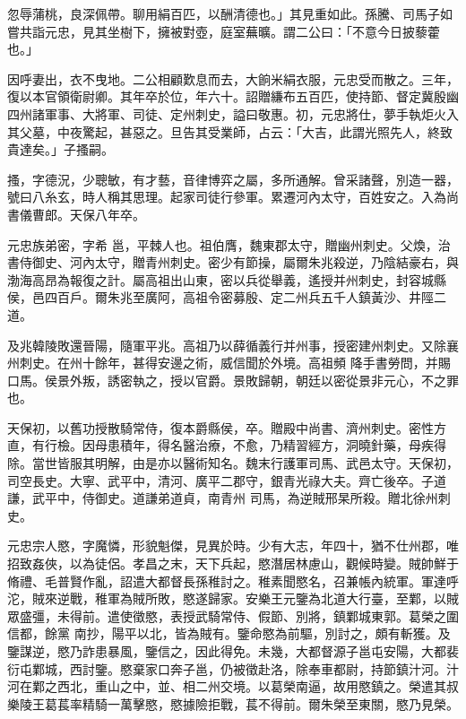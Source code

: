 \begin{pinyinscope}
 忽辱蒲桃，良深佩帶。聊用絹百匹，以酬清德也。」其見重如此。孫騰、司馬子如嘗共詣元忠，見其坐樹下，擁被對壺，庭室蕪曠。謂二公曰：「不意今日披藜藿也。」



 因呼妻出，衣不曳地。二公相顧歎息而去，大餉米絹衣服，元忠受而散之。三年，
 復以本官領衛尉卿。其年卒於位，年六十。詔贈縑布五百匹，使持節、督定冀殷幽四州諸軍事、大將軍、司徒、定州刺史，謚曰敬惠。初，元忠將仕，夢手執炬火入其父墓，中夜驚起，甚惡之。旦告其受業師，占云：「大吉，此謂光照先人，終致貴達矣。」子搔嗣。



 搔，字德況，少聰敏，有才藝，音律博弈之屬，多所通解。曾采諸聲，別造一器，號曰八糸玄，時人稱其思理。起家司徒行參軍。累遷河內太守，百姓安之。入為尚書儀曹郎。天保八年卒。



 元忠族弟密，字希
 邕，平棘人也。祖伯膺，魏東郡太守，贈幽州刺史。父煥，治書侍御史、河內太守，贈青州刺史。密少有節操，屬爾朱兆殺逆，乃陰結豪右，與渤海高昂為報復之計。屬高祖出山東，密以兵從舉義，遙授并州刺史，封容城縣侯，邑四百戶。爾朱兆至廣阿，高祖令密募殷、定二州兵五千人鎮黃沙、井陘二道。



 及兆韓陵敗還晉陽，隨軍平兆。高祖乃以薛循義行并州事，授密建州刺史。又除襄州刺史。在州十餘年，甚得安邊之術，威信聞於外境。高祖頻
 降手書勞問，并賜口馬。侯景外叛，誘密執之，授以官爵。景敗歸朝，朝廷以密從景非元心，不之罪也。



 天保初，以舊功授散騎常侍，復本爵縣侯，卒。贈殿中尚書、濟州刺史。密性方直，有行檢。因母患積年，得名醫治療，不愈，乃精習經方，洞曉針藥，母疾得除。當世皆服其明解，由是亦以醫術知名。魏末行護軍司馬、武邑太守。天保初，司空長史。大寧、武平中，清河、廣平二郡守，銀青光祿大夫。齊亡後卒。子道謙，武平中，侍御史。道謙弟道貞，南青州
 司馬，為逆賊邢杲所殺。贈北徐州刺史。



 元忠宗人愍，字魔憐，形貌魁傑，見異於時。少有大志，年四十，猶不仕州郡，唯招致姦俠，以為徒侶。孝昌之末，天下兵起，愍潛居林慮山，觀候時變。賊帥鮮于脩禮、毛普賢作亂，詔遣大都督長孫稚討之。稚素聞愍名，召兼帳內統軍。軍達呼沱，賊來逆戰，稚軍為賊所敗，愍遂歸家。安樂王元鑒為北道大行臺，至鄴，以賊眾盛彊，未得前。遣使徵愍，表授武騎常侍、假節、別將，鎮鄴城東郭。葛榮之圍信都，餘黨
 南抄，陽平以北，皆為賊有。鑒命愍為前驅，別討之，頗有斬獲。及鑒謀逆，愍乃詐患暴風，鑒信之，因此得免。未幾，大都督源子邕屯安陽，大都裴衍屯鄴城，西討鑒。愍棄家口奔子邕，仍被徵赴洛，除奉車都尉，持節鎮汁河。汁河在鄴之西北，重山之中，並、相二州交境。以葛榮南逼，故用愍鎮之。榮遣其叔樂陵王葛萇率精騎一萬擊愍，愍據險拒戰，萇不得前。爾朱榮至東關，愍乃見榮。




\end{pinyinscope}
